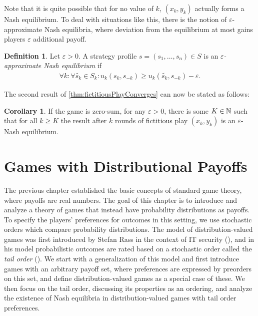 \documentclass[a4paper,DIV=11]{scrreprt}
\let\epsilon\varepsilon
\theoremstyle{definition}
\newtheorem{cor}[thm]{Corollary}
\newtheorem{defn}[thm]{Definition} %
\begin{document}
    Note that it is quite possible that for no value of $k$, $(x_k, y_k)$ actually forms a Nash equilibrium.
    To deal with situations like this, there is the notion of $\epsilon$-approximate Nash equilibria, where deviation from the equilibrium at most gains players $\epsilon$ additional payoff.
        
    \begin{defn}
        Let $\epsilon > 0$.
        A strategy profile $s = (s_1, \dots, s_n) \in S$ is an \emph{$\epsilon$-approximate Nash equilibrium} if
        \begin{gather*} 
            \forall k: \forall \tilde{s_k} \in S_k: u_k(s_k, s_{-k}) \geq u_k(\tilde{s_k}, s_{-k}) - \epsilon.
        \end{gather*} 
    \end{defn}

    The second result of \ref{thm:fictitiousPlayConverges} can now be stated as follows:
    \begin{cor}
        If the game is zero-sum, for any $\epsilon > 0$, there is some $K \in \mathbb{N}$ such that for all $k \geq K$ the result after $k$ rounds of fictitious play $(x_k, y_k)$ is an $\epsilon$-Nash equilibrium.
    \end{cor}

    
    
    \chapter{Games with Distributional Payoffs}
    \label{chap:gamesWithDistributionalPayoffs}
    The previous chapter established the basic concepts of standard game theory, where payoffs are real numbers.
    The goal of this chapter is to introduce and analyze a theory of games that instead have probability distributions as payoffs.
    To specify the players' preferences for outcomes in this setting, we use stochastic orders which compare probability distributions.
    The model of distribution-valued games was first introduced by Stefan Rass
    in the context of IT security (\cite{bib:rassGameRiskManagI,bib:rassGameRiskManagII,bib:rassGameRiskManagIII}), and in his model probabilistic outcomes are rated based on a stochastic order called the \emph{tail order} (\cite{bib:rassTotalOrderingOnLossDistributions}).
    We start with a generalization of this model and first introduce games with an arbitrary payoff set, where preferences are expressed by preorders on this set, and define distribution-valued games as a special case of these.
    We then focus on the tail order, discussing its properties as an ordering, and analyze the existence of Nash equilibria in distribution-valued games with tail order preferences.
    
\end{document}
